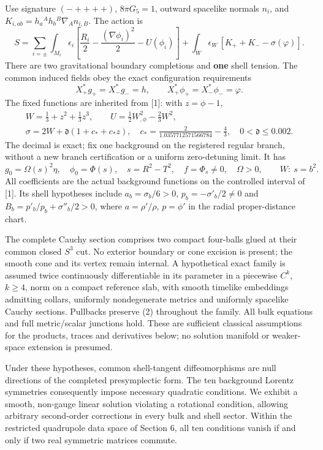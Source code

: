 \documentclass[
  10pt,
]{article}
\begin{document}
Use signature \((-++++)\), \(8\pi G_5=1\), outward spacelike normals
\(n_i\), and \(K_{i,ab}=h_a{}^Ah_b{}^B\nabla_A n_{i,B}\). The action is
\[
 S=\sum_{i=\pm}\int_{M_i}\epsilon_i
 \left[\frac{R_i}{2}-\frac{(\nabla\phi_i)^2}{2}-U(\phi_i)\right]
 +\int_W\epsilon_W\,[K_++K_--\sigma(\varphi)].             \tag{1}
\] There are two gravitational boundary completions and \textbf{one}
shell tension. The common induced fields obey the exact configuration
requirements \[
 X_+^*g_+=X_-^*g_-=h,\qquad
 X_+^*\phi_+=X_-^*\phi_-=\varphi.                         \tag{2}
\] The fixed functions are inherited from {[}1{]}: with \(z=\phi-1\), \[
 \begin{gathered}
 W=\tfrac13+z^2+\tfrac13z^3,\qquad
 U=\tfrac12W_{,\phi}^2-\tfrac23W^2,\\
 \sigma=2W+\mathfrak d(1+c_*+c_*z),\quad
 c_*=\frac2{1.0357712571566784}-\frac43,\quad
 0<\mathfrak d\le0.002 .
 \end{gathered}                                           \tag{3}
\] The decimal is exact; fix one background on the registered regular
branch, without a new branch certification or a uniform zero-detuning
limit. It has \[
 g_0=\Omega(s)^2\eta,\quad\phi_0=\Phi(s),\quad
 s=R^2-T^2,\quad f=\Phi_s\ne0,\quad\Omega>0,
 \qquad W:\ s=b^2.                                      \tag{4}
\] All coefficients are the actual background functions on the
controlled interval of {[}1{]}. Its shell hypotheses include
\(a_b=\sigma_b/6>0\), \(p_b=-\sigma'_b/2\ne0\) and
\(B_b=p'_b/p_b+\sigma''_b/2>0\), where \(a=\rho'/\rho\), \(p=\phi'\) in
the radial proper-distance chart.

The complete Cauchy section comprises two compact four-balls glued at
their common closed \(S^3\) cut. No exterior boundary or cone excision
is present; the smooth cone and its vertex remain internal. A
hypothetical exact family is assumed twice continuously differentiable
in its parameter in a piecewise \(C^k\), \(k\ge4\), norm on a compact
reference slab, with smooth timelike embeddings admitting collars,
uniformly nondegenerate metrics and uniformly spacelike Cauchy sections.
Pullbacks preserve (2) throughout the family. All bulk equations and
full metric/scalar junctions hold. These are sufficient classical
assumptions for the products, traces and derivatives below; no solution
manifold or weaker-space extension is presumed.

Under these hypotheses, common shell-tangent diffeomorphisms are null
directions of the completed presymplectic form. The ten background
Lorentz symmetries consequently impose necessary quadratic conditions.
We exhibit a smooth, non-gauge linear solution violating a rotational
condition, allowing arbitrary second-order corrections in every bulk and
shell sector. Within the restricted quadrupole data space of Section 6,
all ten conditions vanish if and only if two real symmetric matrices
commute.
\end{document}
